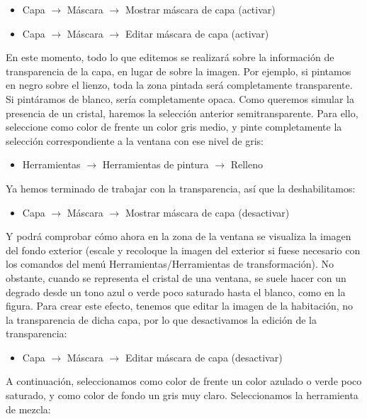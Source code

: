 \documentclass[es,practica]{uah}
\begin{document}
\begin{itemize}
	\item Capa $\rightarrow$ Máscara $\rightarrow$ Mostrar máscara de capa (activar)
	\item Capa $\rightarrow$ Máscara $\rightarrow$ Editar máscara de capa (activar)
\end{itemize}

En este momento, todo lo que editemos se realizará sobre la información de transparencia de la capa, en lugar de sobre la imagen. Por ejemplo, si pintamos en negro sobre el lienzo, toda la zona pintada será completamente transparente. Si pintáramos de blanco, sería completamente opaca. Como queremos simular la presencia de un cristal, haremos la selección anterior semitransparente. Para ello, seleccione como color de frente un color gris medio, y pinte completamente la selección correspondiente a la ventana con ese nivel de gris:

\begin{itemize}
	\item Herramientas $\rightarrow$ Herramientas de pintura $\rightarrow$ Relleno
\end{itemize}

Ya hemos terminado de trabajar con la transparencia, así que la deshabilitamos:

\begin{itemize}
	\item Capa $\rightarrow$ Máscara $\rightarrow$ Mostrar máscara de capa (desactivar)
\end{itemize}

Y podrá comprobar cómo ahora en la zona de la ventana se visualiza la imagen del
fondo exterior (escale y recoloque la imagen del exterior si fuese necesario con los
comandos del menú Herramientas/Herramientas de transformación). No obstante,
cuando se representa el cristal de una ventana, se suele hacer con un degrado desde
un tono azul o verde poco saturado hasta el blanco, como en la figura. Para crear
este efecto, tenemos que editar la imagen de la habitación, no la transparencia de dicha capa, por lo que desactivamos la edición de la transparencia:

\begin{itemize}
	\item Capa $\rightarrow$ Máscara $\rightarrow$ Editar máscara de capa (desactivar)
\end{itemize}

A continuación, seleccionamos como color de frente un color azulado o verde poco saturado, y como color de fondo un gris muy claro. Seleccionamos la herramienta de mezcla:
\end{document}
